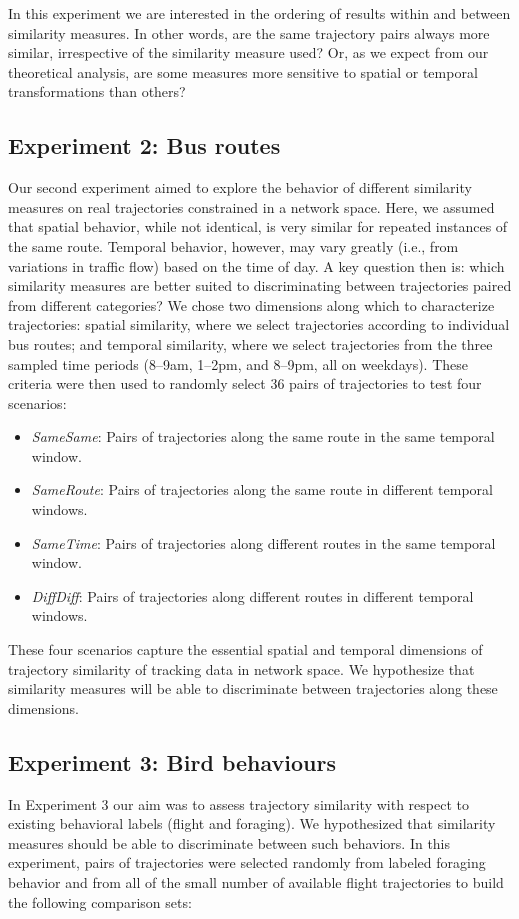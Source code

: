 \documentclass{interact}
\begin{document}
In this experiment we are interested in the ordering of results within and between similarity measures. In other words, are the same trajectory pairs always more similar, irrespective of the similarity measure used? Or, as we expect from our theoretical analysis, are some measures more sensitive to spatial or temporal transformations than others?

\subsection{Experiment 2: Bus routes}
\label{par:experiment_2}
Our second experiment aimed to explore the behavior of different similarity measures on real trajectories constrained in a network space. Here, we assumed that spatial behavior, while not identical, is very similar for repeated instances of the same route. Temporal behavior, however, may vary greatly (i.e., from variations in traffic flow) based on the time of day. A key question then is: which similarity measures are better suited to discriminating between trajectories paired from different categories? We chose two dimensions along which to characterize trajectories: spatial similarity, where we select trajectories according to individual bus routes; and temporal similarity, where we select trajectories from the three sampled time periods (8--9am, 1--2pm, and 8--9pm, all on weekdays). These criteria were then used to randomly select 36 pairs of trajectories to test four scenarios:
\begin{itemize}
\item \emph{SameSame}: Pairs of trajectories along the same route in the same temporal window.
\item \emph{SameRoute}: Pairs of trajectories along the same route in different temporal windows.
\item \emph{SameTime}: Pairs of trajectories along different routes in the same temporal window.
\item \emph{DiffDiff}: Pairs of trajectories along different routes in different temporal windows.
\end{itemize}

These four scenarios capture the essential spatial and temporal dimensions of trajectory similarity of tracking data in network space. We hypothesize that similarity measures will be able to discriminate between trajectories along these dimensions.

\subsection{Experiment 3: Bird behaviours} %
\label{par:experiment_3}
In Experiment 3 our aim was to assess trajectory similarity with respect to existing behavioral labels (flight and foraging). We hypothesized that similarity measures should be able to discriminate between such behaviors. In this experiment, pairs of trajectories were selected randomly from labeled foraging behavior and from all of the small number of available flight trajectories to build the following comparison sets:
\end{document}
